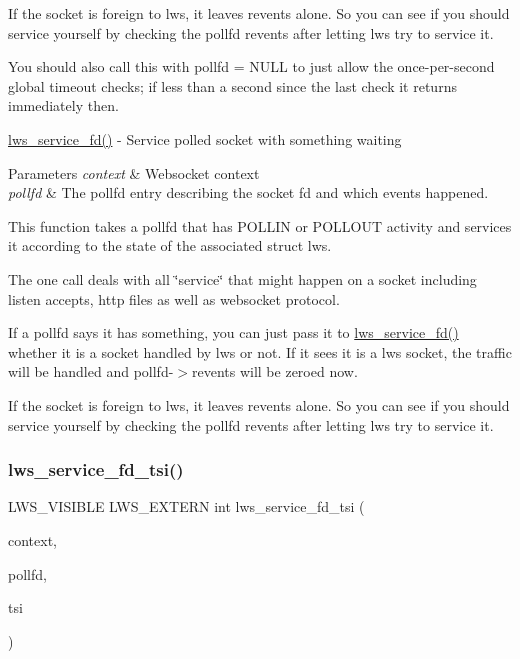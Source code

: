 If the socket is foreign to lws, it leaves revents alone. So you can see if you should service yourself by checking the pollfd revents after letting lws try to service it.

You should also call this with pollfd = N\+U\+LL to just allow the once-\/per-\/second global timeout checks; if less than a second since the last check it returns immediately then.

\hyperlink{group__service_gad82efa5466d14a9f05aa06416375b28d}{lws\+\_\+service\+\_\+fd()} -\/ Service polled socket with something waiting 
\begin{DoxyParams}{Parameters}
{\em context} & Websocket context \\
\hline
{\em pollfd} & The pollfd entry describing the socket fd and which events happened.\\
\hline
\end{DoxyParams}
This function takes a pollfd that has P\+O\+L\+L\+IN or P\+O\+L\+L\+O\+UT activity and services it according to the state of the associated struct lws.

The one call deals with all \char`\"{}service\char`\"{} that might happen on a socket including listen accepts, http files as well as websocket protocol.

If a pollfd says it has something, you can just pass it to \hyperlink{group__service_gad82efa5466d14a9f05aa06416375b28d}{lws\+\_\+service\+\_\+fd()} whether it is a socket handled by lws or not. If it sees it is a lws socket, the traffic will be handled and pollfd-\/$>$revents will be zeroed now.

If the socket is foreign to lws, it leaves revents alone. So you can see if you should service yourself by checking the pollfd revents after letting lws try to service it. \mbox{\label{group__service_gaebf426eda371ba23642fc11d8e0ace6b}} 
\subsubsection{\texorpdfstring{lws\+\_\+service\+\_\+fd\+\_\+tsi()}{lws\_service\_fd\_tsi()}}
{\footnotesize\ttfamily L\+W\+S\+\_\+\+V\+I\+S\+I\+B\+LE L\+W\+S\+\_\+\+E\+X\+T\+E\+RN int lws\+\_\+service\+\_\+fd\+\_\+tsi (\begin{DoxyParamCaption}\item[{struct \hyperlink{structlws__context}{lws\+\_\+context} $\ast$}]{context,  }\item[{struct lws\+\_\+pollfd $\ast$}]{pollfd,  }\item[{int}]{tsi }\end{DoxyParamCaption})}

